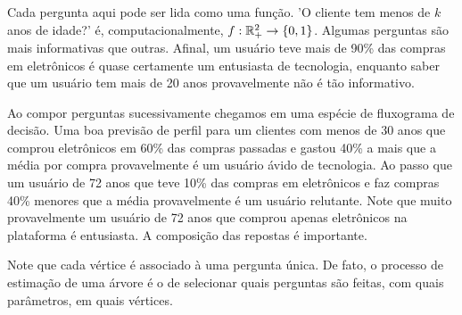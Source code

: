 \begin{exemplo}
Cada pergunta aqui pode ser lida como uma função. 'O cliente tem menos de $k$ anos de idade?' é, computacionalmente,  $f: \mathbb{R}^2_+ \to \{0, 1\}$. Algumas perguntas são mais informativas que outras. Afinal, um usuário teve mais de 90\% das compras em eletrônicos é quase certamente um entusiasta de tecnologia, enquanto saber que um usuário tem mais de 20 anos provavelmente não é tão informativo. 

Ao compor perguntas sucessivamente chegamos em uma espécie de fluxograma de decisão. Uma boa previsão de perfil para um clientes com menos de 30 anos que comprou eletrônicos em 60\% das compras passadas e gastou 40\% a mais que a média por compra provavelmente é um usuário ávido de tecnologia. Ao passo que um usuário de 72 anos que teve 10\% das compras em eletrônicos e faz compras 40\% menores que a média provavelmente é um usuário relutante. Note que muito provavelmente um usuário de 72 anos que comprou apenas eletrônicos na plataforma é entusiasta. A composição das repostas é importante.

Note que cada vértice é associado à uma pergunta única. De fato, o processo de estimação de uma árvore é o de selecionar quais perguntas são feitas, com quais parâmetros, em quais vértices. 
\end{exemplo}






